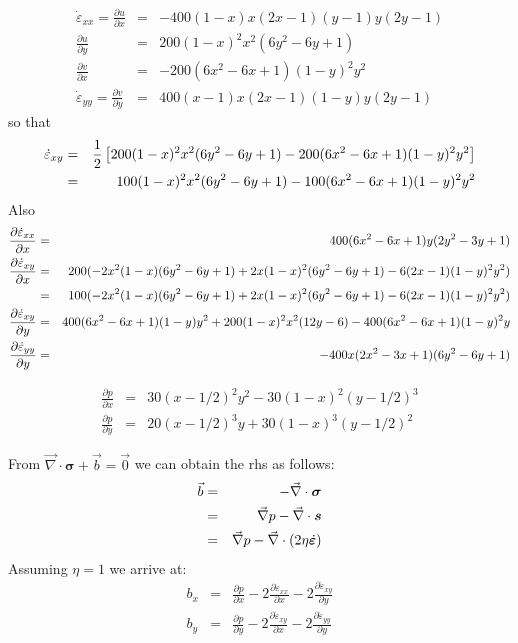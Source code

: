 \begin{eqnarray}
\dot{\varepsilon}_{xx}=\frac{\partial u}{\partial x} &=& -400(1-x)x(2x-1)(y-1)y(2y-1)  \\
\frac{\partial u}{\partial y} &=& 200(1-x)^2x^2 (6y^2-6y+1)  \\
\frac{\partial v}{\partial x} &=& -200(6x^2-6x+1)(1-y)^2y^2  \\
\dot{\varepsilon}_{yy}=\frac{\partial v}{\partial y} &=& 400(x-1)x(2x-1)(1-y)y(2y-1) 
\end{eqnarray}
so that 
\begin{eqnarray}
\dot{\varepsilon}_{xy}
&=&\frac{1}{2} \left[ 200(1-x)^2x^2 (6y^2-6y+1)   -200(6x^2-6x+1)(1-y)^2y^2  \right] \nonumber\\
&=&100(1-x)^2x^2 (6y^2-6y+1)   -100(6x^2-6x+1)(1-y)^2y^2 
\end{eqnarray}
Also
\begin{eqnarray}
\frac{\partial \dot{\varepsilon}_{xx}}{\partial x} &=& 400(6x^2-6x+1)y(2y^2-3y+1) \nonumber\\
\frac{\partial \dot{\varepsilon}_{xy}}{\partial x} 
&=& 200 (-2 x^2 (1 - x) (6 y^2 - 6 y + 1) + 2 x (1 - x)^2 (6 y^2 - 6 y + 1) - 6 (2 x - 1) (1 - y)^2 y^2)\nonumber\\
&=&  100 (-2 x^2 (1 - x) (6 y^2 - 6 y + 1) + 2 x (1 - x)^2 (6 y^2 - 6 y + 1) - 6 (2 x - 1) (1 - y)^2 y^2) \nonumber\\
\frac{\partial \dot{\varepsilon}_{xy}}{\partial y} &=& 400 (6 x^2 - 6 x + 1) (1 - y) y^2 + 200 (1 - x)^2 x^2 (12 y - 6) - 400 (6 x^2 - 6 x + 1) (1 - y)^2 y   \nonumber \\
\frac{\partial \dot{\varepsilon}_{yy}}{\partial y} &=& -400x(2x^2-3x+1)(6y^2-6y+1) 
\end{eqnarray}


\begin{eqnarray}
\frac{\partial p}{\partial x} &=& 30(x-1/2)^2y^2-30(1-x)^2(y-1/2)^3 \\
\frac{\partial p}{\partial y} &=& 20(x-1/2)^3y + 30(1-x)^3(y-1/2)^2  
\end{eqnarray}

From $\vec\nabla\cdot{\bm \sigma}+\vec{b}=\vec{0}$ we can obtain the rhs as follows:
\begin{eqnarray}
\vec{b} 
&=& - \vec\nabla\cdot{\bm \sigma} \nonumber\\ 
&=& \vec\nabla p -  \vec\nabla\cdot{\bm s} \nonumber\\ 
&=& \vec\nabla p -  \vec\nabla\cdot(2 \eta \dot{\bm \varepsilon})  
\end{eqnarray}
Assuming $\eta=1$ we arrive at:
\begin{eqnarray}
b_x &=&  \frac{\partial p}{\partial x} 
-2\frac{\partial \dot{\varepsilon}_{xx}}{\partial x}  
-2\frac{\partial \dot{\varepsilon}_{xy}}{\partial y}  \\
b_y &=&  \frac{\partial p}{\partial y}  
-2\frac{\partial \dot{\varepsilon}_{xy}}{\partial x} 
-2\frac{\partial \dot{\varepsilon}_{yy}}{\partial y}  
\end{eqnarray}

